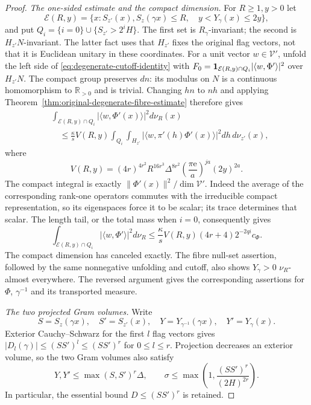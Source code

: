 \begin{proof}
\emph{The one-sided estimate and the compact dimension.}
For $R\ge1,y>0$ let
\[
 \mathcal E(R,y)=
  \{x:S_{z'}(x),S_z(\gamma x)\le R,\quad y<Y_\gamma(x)\le2y\},
\]
and put $Q_i=\{i=0\}\cup\{S_{z'}>2^iH\}$.
The first set is $R_\gamma$-invariant; the second is
$H_{z'}N$-invariant.  The latter fact uses that $H_{z'}$
fixes the original flag vectors, not that it is Euclidean
unitary in these coordinates.
For a unit vector $w\in\mathcal V'$, unfold
the left side of \eqref{eq:degenerate-cutoff-identity} with
$F_0={\bf1}_{\mathcal E(R,y)\cap Q_i}
|\langle w,\Phi'\rangle|^2$ over $H_{z'}N$.
The compact group preserves $dn$: its modulus on $N$ is
a continuous homomorphism to $\mathbb R_{>0}$ and is trivial.
Changing $hn$ to $nh$ and applying
Theorem~\ref{thm:original-degenerate-fibre-estimate} therefore gives
\begin{align*}
 &\int_{\mathcal E(R,y)\cap Q_i}
                  |\langle w,\Phi'(x)\rangle|^2d\nu_R(x)\\
 &\quad\le\frac{\kappa}{s}V(R,y)
       \int_{Q_i}\int_{H_{z'}}
                  |\langle w,\pi'(h)\Phi'(x)\rangle|^2dh\,d\nu_{z'}(x),
\end{align*}
where
\[
 V(R,y)=(4r)^{4r^2}R^{16r^3}\Delta^{8r^2}
                    \left(\frac{\pi\mathrm e}{a}\right)^{ja}(2y)^{2a}.
\]
The compact integral is exactly
$\|\Phi'(x)\|^2/\dim\mathcal V'$.
Indeed the average of the corresponding rank-one operators
commutes with the irreducible compact representation, so its
eigenspaces force it to be scalar; its trace determines that scalar.
The length tail, or the total mass when $i=0$, consequently gives
\begin{equation}\label{eq:actual-degenerate-one-side}
 \int_{\mathcal E(R,y)\cap Q_i}
       |\langle w,\Phi'\rangle|^2d\nu_R
 \le\frac{\kappa}{s}V(R,y)(4r+4)2^{-2qi}c_\Phi.
\end{equation}
The compact dimension has canceled exactly.
The fibre null-set assertion, followed by the same nonnegative
unfolding and cutoff, also shows $Y_\gamma>0$ $\nu_R$-almost
everywhere.  The reversed argument gives the corresponding
assertions for $\Phi$, $\gamma^{-1}$ and its transported measure.

\emph{The two projected Gram volumes.}
Write
\[
 S=S_z(\gamma x),\quad S'=S_{z'}(x),\quad
 Y=Y_{\gamma^{-1}}(\gamma x),\quad Y'=Y_\gamma(x).
\]
Exterior Cauchy--Schwarz for the first $l$ flag vectors gives
$|D_l(\gamma)|\le(SS')^l\le(SS')^r$ for $0\le l\le r$.
Projection decreases an exterior volume, so the two Gram
volumes also satisfy
\[
 Y,Y'\le\max(S,S')^r\Delta,\qquad
 \sigma\le\max\left(1,\frac{(SS')^r}{(2H)^{2r}}\right).
\]
In particular, the essential bound $D\le(SS')^r$ is retained.


\end{proof}
